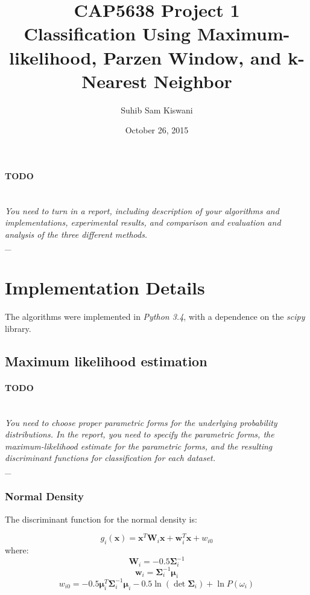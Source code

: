 \documentclass{article}
\title{
    CAP5638 Project 1\\
    \large Classification Using Maximum-likelihood, Parzen Window, and k-Nearest Neighbor
}
\author{Suhib Sam Kiswani}
\date{October 26, 2015}
\newcommand{\bx}{\mathbf{x}}
\newcommand{\bm}{\mathbf{\mu}}
\newcommand{\bsig}{\mathbf{\Sigma}}
\newcommand{\outline}[2]{\paragraph{\textsc{#1}}\hrulefill~\\{\small\it #2}\\\_\hrulefill~\\}
\newcommand{\todo}[1]{\outline{\large TODO}{#1}}
\begin{document}
\maketitle

\todo{You need to turn in a report, including description of your algorithms and implementations,
experimental results, and comparison and evaluation and analysis of the three different methods.}


\section{Implementation Details}

The algorithms were implemented in {\it Python 3.4}, with a dependence on the \textit{scipy} \cite{sp} library.

\subsection{Maximum likelihood estimation}
\todo{You need to choose proper parametric forms for the underlying probability distributions. In the report, you need to specify the parametric forms, the maximum-likelihood estimate for the parametric forms, and the resulting discriminant functions for classification for each dataset.}

\subsubsection{Normal Density}
The discriminant function for the normal density is:

$$g_i(\bx) = \bx^T\mathbf{W}_i\bx + \mathbf{w}_i^T \bx + w_{i0}$$
where:
$$\mathbf{W}_i = -0.5 \bsig_i^{-1}$$
$$\mathbf{w}_i = \bsig_i^{-1} \bm_i$$
$$w_{i0} = -0.5 \bm_i^T \bsig_i^{-1} \bm_i - 0.5\ln \left( \det \bsig_i \right) + \ln P(\omega_i)$$
\end{document}
